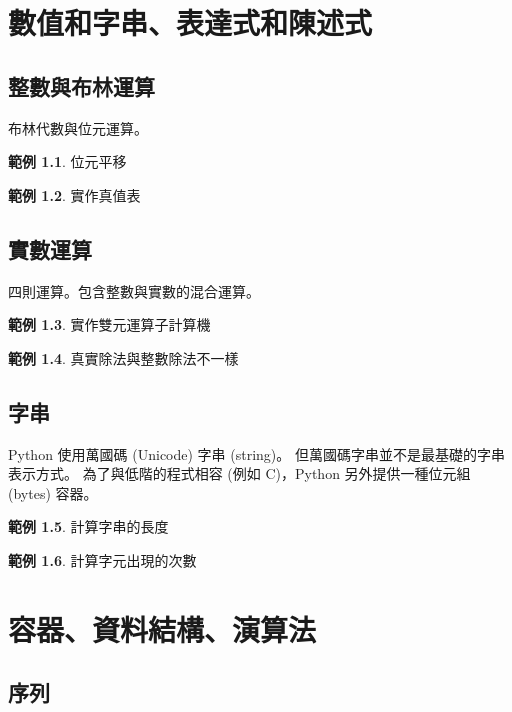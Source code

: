 \documentclass[a4paper,12pt]{book}
\theoremstyle{definition}
\newtheorem{example}{範例}[chapter]
\begin{document}
\chapter{數值和字串、表達式和陳述式}
%
\label{c:arithmic}

\section{整數與布林運算}

布林代數與位元運算。

\begin{example}
位元平移
\end{example}

\begin{example}
實作真值表
\end{example}

\section{實數運算}

四則運算。包含整數與實數的混合運算。

\begin{example}
實作雙元運算子計算機
\end{example}

\begin{example}
真實除法與整數除法不一樣
\end{example}

\section{字串}

Python 使用萬國碼 (Unicode) 字串 (string)。
但萬國碼字串並不是最基礎的字串表示方式。
為了與低階的程式相容 (例如 C)，Python 另外提供一種位元組 (bytes) 容器。

\begin{example}
計算字串的長度
\end{example}

\begin{example}
計算字元出現的次數
\end{example}

\chapter{容器、資料結構、演算法}
%
\label{c:container}

\section{序列}
\end{document}
